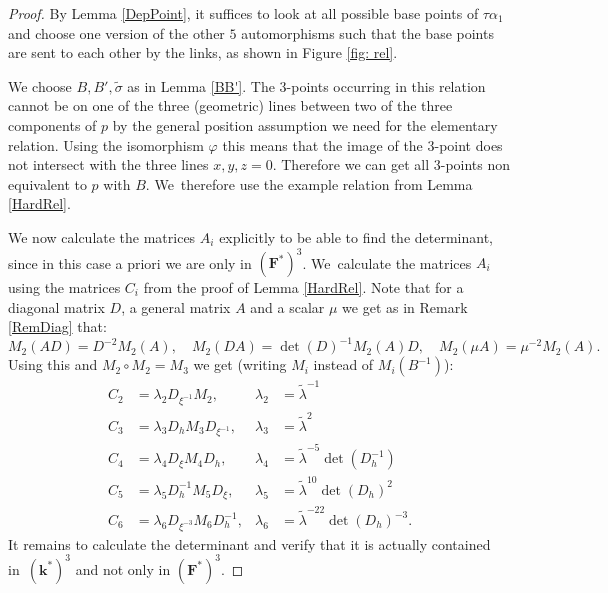 \documentclass[JEP,XML,SOM,Unicode,NoFloatCountersInSection, NoEqCountersInSection,published]{cedram}
\theoremstyle{definition}
\newcommand{\kk}{{\boldsymbol{k}}}
\newcommand{\FF}{{\boldsymbol{F}}}
\begin{document}
\begin{proof}
By Lemma \ref{DepPoint}, it suffices to look at all possible base points of $\tau \alpha_1$ and choose one version of the other $5$ automorphisms such that the base points are sent to each other by the links, as shown in Figure \ref{fig: rel}.

We choose $B,B', \tilde \sigma$ as in Lemma \ref{BB'}. The $3$\nobreakdash-points occurring in this relation cannot be on one of the three (geometric) lines between two of the three components of $p$ by the general position assumption we need for the elementary relation. Using the isomorphism $\varphi$ this means that the image of the $3$\nobreakdash-point does not intersect with the three lines $x,y,z = 0$. Therefore we can get all $3$\nobreakdash-points non equivalent to $p$ with $B$. We~therefore use the example relation from Lemma \ref{HardRel}.

We now calculate the matrices $A_i$ explicitly to be able to find the determinant, since in this case a priori we are only in $(\FF^*)^3$. We~calculate the matrices $A_i$ using the matrices $C_i$ from the proof of Lemma \ref{HardRel}. Note that for a diagonal matrix $D$, a general matrix $A$ and a scalar $\mu$ we get as in Remark \ref{RemDiag} that:
\[
M_2(A D) = D^{-2} M_2(A),
\quad
M_2(DA) = \det(D)^{-1} M_2(A) D,
\quad
M_2(\mu A) = \mu^{-2} M_2(A).
\]
Using this and $M_2 \circ M_2 = M_3$ we get (writing $M_i$ instead of $M_i(B^{-1})$):
\begin{align*}
C_2 &= \lambda_2 D_{\xi^{-1}} M_2, & \lambda_2 &= \tilde \lambda^{-1}
\\
C_3 &= \lambda_3 D_h M_3 D_{\xi^{-1}}, &\lambda_3 &= \tilde \lambda^2
\\
C_4 &= \lambda_4 D_{\xi} M_4 D_h, &\lambda_4 &= \tilde \lambda^{-5} \det(D_h^{-1})
\\
C_5 &= \lambda_5 D_h^{-1} M_5 D_{\xi}, &\lambda_5 &= \tilde \lambda^{10} \det(D_h)^2
\\
C_6 &= \lambda_6 D_{\xi^{-3}} M_6 D_h^{-1}, &\lambda_6 &=\tilde \lambda^{-22} \det(D_h)^{-3}.
\end{align*}
It remains to calculate the determinant and verify that it is actually contained in~$(\kk^*)^3$ and not only in $(\FF^*)^3$.


\end{proof}
\end{document}
